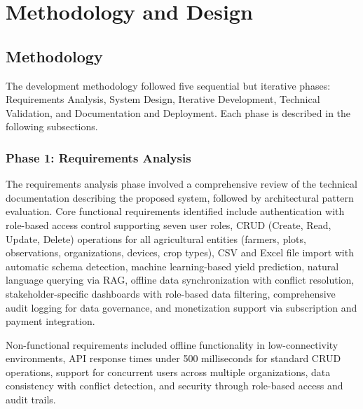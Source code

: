 \documentclass[12pt,a4paper,oneside]{report}
\begin{document}
\clearpage
\chapter{Methodology and Design}

\section{Methodology}
The development methodology followed five sequential but iterative phases: Requirements Analysis, System Design, Iterative Development, Technical Validation, and Documentation and Deployment. Each phase is described in the following subsections.

\subsection{Phase 1: Requirements Analysis}
The requirements analysis phase involved a comprehensive review of the technical documentation describing the proposed system, followed by architectural pattern evaluation. Core functional requirements identified include authentication with role-based access control supporting seven user roles, CRUD (Create, Read, Update, Delete) operations for all agricultural entities (farmers, plots, observations, organizations, devices, crop types), CSV and Excel file import with automatic schema detection, machine learning-based yield prediction, natural language querying via RAG, offline data synchronization with conflict resolution, stakeholder-specific dashboards with role-based data filtering, comprehensive audit logging for data governance, and monetization support via subscription and payment integration.

Non-functional requirements included offline functionality in low-connectivity environments, API response times under 500 milliseconds for standard CRUD operations, support for concurrent users across multiple organizations, data consistency with conflict detection, and security through role-based access and audit trails.
\end{document}
